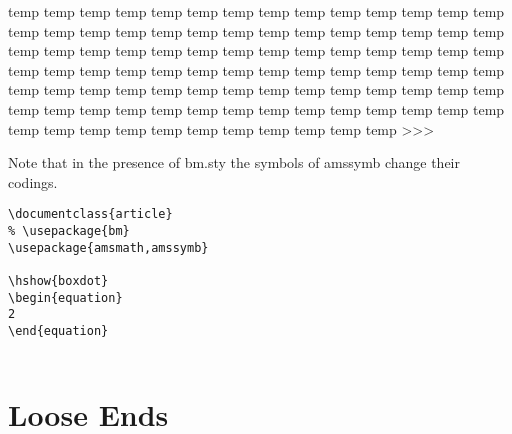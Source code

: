 {{{{{{\:temp \nleq
\:temp \ngeq
\:temp \nless
\:temp \ngtr
\:temp \nprec
\:temp \nsucc
\:temp \lneqq
\:temp \gneqq
\:temp \nleqslant
\:temp \ngeqslant
{}
\:temp \gneq
\:temp \npreceq
\:temp \nsucceq
\:temp \precnsim
\:temp \succnsim
\:temp \lnsim
\:temp \gnsim
\:temp \nleqq
\:temp \ngeqq
\:temp \precneqq
\:temp \succneqq
\:temp \precnapprox
\:temp \succnapprox
\:temp \lnapprox
\:temp \gnapprox
\:temp \nsim
\:temp \ncong
\:temp \varsubsetneq
\:temp \varsupsetneq
\:temp \nsubseteqq
\:temp \nsupseteqq
\:temp \subsetneqq
\:temp \supsetneqq
\:temp \varsubsetneqq
\:temp \varsupsetneqq
\:temp \subsetneq
\:temp \supsetneq
\:temp \nsubseteq
\:temp \nsupseteq
\:temp \nparallel
\:temp \nmid
\:temp \nshortmid
\:temp \nshortparallel
\:temp \nvdash
\:temp \nVdash
\:temp \nvDash
\:temp \nVDash
\:temp \ntrianglerighteq
\:temp \ntrianglelefteq
\:temp \ntriangleleft
\:temp \ntriangleright
\:temp \nleftarrow
\:temp \nrightarrow
\:temp \nLeftarrow
\:temp \nRightarrow
\:temp \nLeftrightarrow
\:temp \nleftrightarrow
\:temp \eqsim
\:temp \shortmid
\:temp \shortparallel
\:temp \thicksim
\:temp \thickapprox
\:temp \approxeq
\:temp \succapprox
\:temp \precapprox
\:temp \curvearrowleft
\:temp \curvearrowright
\:temp \backepsilon
\:temp \square
\:temp \blacksquare
\:temp \lozenge
\:temp \blacklozenge
\:temp \backprime
\:temp \bigstar
\:temp \blacktriangledown
\:temp \blacktriangle
\:temp \triangledown
\:temp \measuredangle
\:temp \sphericalangle
\:temp \circledS
\:temp \complement
\:temp \diagup
\:temp \diagdown
\:temp \varnothing
\:temp \nexists
\:temp \Finv
\:temp \Game
\:temp \eth
\:temp \beth
\:temp \gimel
\:temp \daleth
\:temp \digamma
\:temp \varkappa
\:temp \Bbbk
\:temp \hslash
>>>

Note that in the presence of bm.sty the symbols of amssymb change their
codings.

\begin{verbatim}
\documentclass{article}  
% \usepackage{bm}  
\usepackage{amsmath,amssymb}  
  
\hshow{boxdot} 
\begin{equation}  
2 
\end{equation}  
 
\end{verbatim}


\chapter{Loose Ends}

}}}}}}

